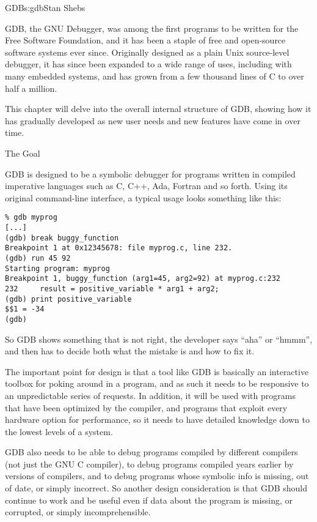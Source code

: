 \begin{aosachapter}{GDB}{s:gdb}{Stan Shebs}

GDB, the GNU Debugger, was among the first programs to be written for
the Free Software Foundation, and it has been a staple of free and
open-source software systems ever since.  Originally designed as a
plain Unix source-level debugger, it has since been expanded to a wide
range of uses, including with many embedded systems, and has grown from
a few thousand lines of C to over half a million.

This chapter will delve into the overall internal structure of GDB,
showing how it has gradually developed as new user needs and new
features have come in over time.

\begin{aosasect1}{The Goal}

GDB is designed to be a symbolic debugger for programs written in
compiled imperative languages such as C, C++, Ada, Fortran and so
forth.  Using its original command-line interface, a typical usage
looks something like this:

\begin{verbatim}
% gdb myprog
[...]
(gdb) break buggy_function
Breakpoint 1 at 0x12345678: file myprog.c, line 232.
(gdb) run 45 92
Starting program: myprog
Breakpoint 1, buggy_function (arg1=45, arg2=92) at myprog.c:232
232     result = positive_variable * arg1 + arg2;
(gdb) print positive_variable
$$1 = -34
(gdb)
\end{verbatim}

So GDB shows something that is not right, the developer says ``aha''
or ``hmmm'', and then has to decide both what the mistake is and how
to fix it.

The important point for design is that a tool like GDB is basically an
interactive toolbox for poking around in a program, and as such it
needs to be responsive to an unpredictable series of requests.  In
addition, it will be used with programs that have been optimized by
the compiler, and programs that exploit every hardware option for
performance, so it needs to have detailed knowledge down to the lowest
levels of a system.

GDB also needs to be able to debug programs compiled by different
compilers (not just the GNU C compiler), to debug programs compiled
years earlier by versions of compilers, and to debug programs whose
symbolic info is missing, out of date, or simply incorrect.  So
another design consideration is that GDB should continue to work and
be useful even if data about the program is missing, or corrupted, or
simply incomprehensible.


\end{aosasect1}
\end{aosachapter}
